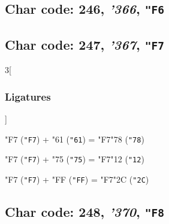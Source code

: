 \documentclass{article}
\newlength{\maxcharwidth}
\begin{document}
\subsection{Char code: 246, {\it'366}, {\tt"F6}}
\label{char_246}


\subsection{Char code: 247, {\it'367}, {\tt"F7}}
\label{char_247}


\begin{multicols}{3}[\subsubsection{Ligatures}]

{\testfont\char"F7\noboundary} ({\tt"F7}) + {\testfont\char"61\noboundary} ({\tt"61}) = {\testfont\char"F7\noboundary}{\testfont\char"78\noboundary} ({\tt"78}) 

{\testfont\char"F7\noboundary} ({\tt"F7}) + {\testfont\char"75\noboundary} ({\tt"75}) = {\testfont\char"F7\noboundary}{\testfont\char"12\noboundary} ({\tt"12}) 

{\testfont\char"F7\noboundary} ({\tt"F7}) + {\testfont\char"FF\noboundary} ({\tt"FF}) = {\testfont\char"F7\noboundary}{\testfont\char"2C\noboundary} ({\tt"2C}) 

\end{multicols}

\subsection{Char code: 248, {\it'370}, {\tt"F8}}
\label{char_248}
\end{document}
